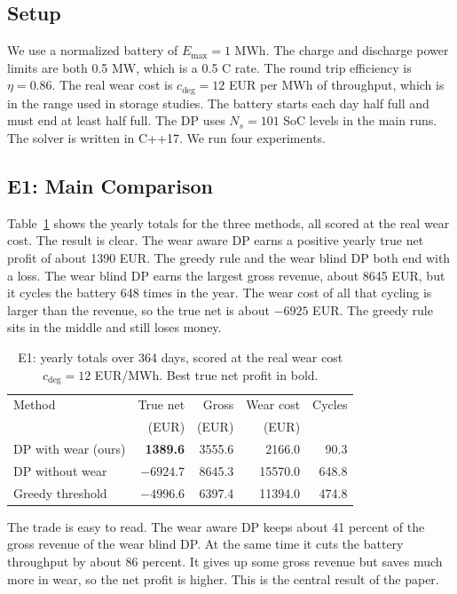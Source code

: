 \documentclass[conference,a4paper]{IEEEtran}
\begin{document}
\subsection{Setup}
We use a normalized battery of $E_{\max}=1$ MWh. The charge and discharge power
limits are both 0.5 MW, which is a 0.5 C rate. The round trip efficiency is
$\eta = 0.86$. The real wear cost is $c_{\text{deg}}=12$ EUR per MWh of
throughput, which is in the range used in storage studies. The battery starts
each day half full and must end at least half full. The DP uses $N_s=101$ SoC
levels in the main runs. The solver is written in C++17. We run four
experiments.

\subsection{E1: Main Comparison}
Table~\ref{tab:e1} shows the yearly totals for the three methods, all scored
at the real wear cost. The result is clear. The wear aware DP earns a positive
yearly true net profit of about 1390 EUR. The greedy rule and the wear blind
DP both end with a loss. The wear blind DP earns the largest gross revenue,
about 8645 EUR, but it cycles the battery 648 times in the year. The wear cost
of all that cycling is larger than the revenue, so the true net is about
$-6925$ EUR. The greedy rule sits in the middle and still loses money.

\begin{table}[t]
\caption{E1: yearly totals over 364 days, scored at the real wear cost
$c_{\text{deg}}=12$ EUR/MWh. Best true net profit in bold.}
\label{tab:e1}
\centering
\small
\begin{tabular}{lrrrr}
\toprule
Method & True net & Gross & Wear cost & Cycles\\
       & (EUR) & (EUR) & (EUR) & \\
\midrule
DP with wear (ours) & \textbf{1389.6} & 3555.6 & 2166.0 & 90.3\\
DP without wear     & $-6924.7$ & 8645.3 & 15570.0 & 648.8\\
Greedy threshold    & $-4996.6$ & 6397.4 & 11394.0 & 474.8\\
\bottomrule
\end{tabular}
\end{table}

The trade is easy to read. The wear aware DP keeps about 41 percent of the
gross revenue of the wear blind DP. At the same time it cuts the battery
throughput by about 86 percent. It gives up some gross revenue but saves much
more in wear, so the net profit is higher. This is the central result of the
paper.
\end{document}
